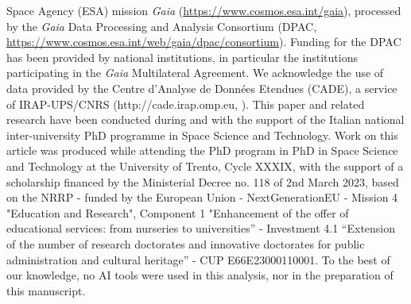 \documentclass{aa}
\begin{document}
\begin{acknowledgements}
  Space Agency (ESA) mission {\it Gaia}
  (\url{https://www.cosmos.esa.int/gaia}), processed by the {\it Gaia}
  Data Processing and Analysis Consortium (DPAC,
  \url{https://www.cosmos.esa.int/web/gaia/dpac/consortium}). Funding
  for the DPAC has been provided by national institutions, in
  particular the institutions participating in the {\it Gaia}
  Multilateral Agreement.  We acknowledge the use of data provided by
  the Centre d'Analyse de Données Etendues (CADE), a service of
  IRAP-UPS/CNRS (http://cade.irap.omp.eu, \citealt{paradis:2012}).  
  This paper and related research have been conducted during and with the support of the Italian national inter-university PhD programme in Space Science and Technology. Work on this article was produced while attending the PhD program in PhD in Space Science and Technology at the University of Trento, Cycle XXXIX, with the support of a scholarship financed by the Ministerial Decree no. 118 of 2nd March 2023, based on the NRRP - funded by the European Union - NextGenerationEU - Mission 4 "Education and Research", Component 1 "Enhancement of the offer of educational services: from nurseries to universities” - Investment 4.1 “Extension of the number of research doctorates and innovative doctorates for public administration and cultural heritage” - CUP E66E23000110001.
  To the best of our knowledge, no AI tools were used in this analysis, nor in the preparation of this manuscript.
\end{acknowledgements}





\end{document}
